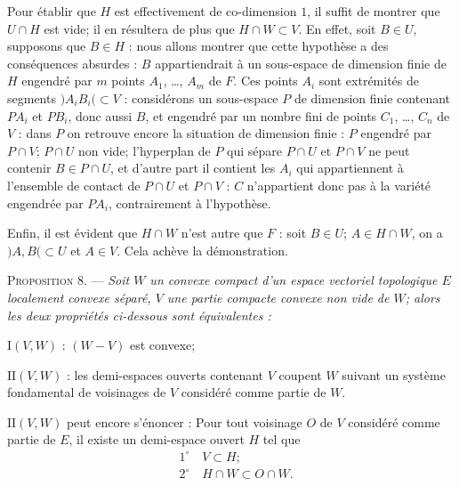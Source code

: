 \documentclass[11pt]{article}
\newenvironment{prop}[1][]{\par\medskip\noindent\textsc{Proposition #1.} --- \itshape}{\par\medskip}
\newenvironment{proof}[1][]{\par}{\par}
\begin{document}
\begin{proof}
Pour établir que $H$ est effectivement de co-dimension $1$, il suffit de montrer que $U\cap H$ est
vide; il en résultera de plus que $H\cap W\subset V$. En effet, soit $B\in U$, supposons que
$B\in H$ : nous allons montrer que cette hypothèse a des conséquences absurdes : $B$
appartiendrait à un sous-espace de dimension finie de $H$ engendré par $m$ points $A_1$, \ldots,
$A_m$ de $F$. Ces points $A_i$ sont extrémités de segments $)A_iB_i(\subset V$ : considérons un
sous-espace $P$ de dimension finie contenant $PA_i$ et $PB_i$, donc aussi $B$, et engendré par un
nombre fini de points $C_1$, \ldots, $C_n$ de $V$ : dans $P$ on retrouve encore la situation de
dimension finie : $P$ engendré par $P\cap V$; $P\cap U$ non vide; l'hyperplan de $P$ qui sépare
$P\cap U$ et $P\cap V$ ne peut contenir $B\in P\cap U$, et d'autre part il contient les $A_i$ qui
appartiennent à l'ensemble de contact de $P\cap U$ et $P\cap V$ : $C$ n'appartient donc pas à la
variété engendrée par $PA_i$, contrairement à l'hypothèse.

Enfin, il est évident que $H\cap W$ n'est autre que $F$ : soit $B\in U$; $A\in H\cap W$, on a
$)A, B(\subset U$ et $A\in V$. Cela achève la démonstration.
\end{proof}

\begin{prop}[8]
Soit $W$ un convexe compact d'un espace vectoriel topologique $E$ localement convexe séparé, $V$
une partie compacte convexe non vide de $W$; alors les deux propriétés ci-dessous sont
équivalentes :

$\mathrm{I}(V, W)$ : $(W-V)$ est convexe;

$\mathrm{II}(V, W)$ : les demi-espaces ouverts contenant $V$ coupent $W$ suivant un système
fondamental de voisinages de $V$ considéré comme partie de $W$.

$\mathrm{II}(V, W)$ peut encore s'énoncer : Pour tout voisinage $O$ de $V$ considéré comme partie
de $E$, il existe un demi-espace ouvert $H$ tel que
\[ \begin{aligned} &1^{\circ}\quad V\subset H;\\ &2^{\circ}\quad H\cap W\subset O\cap W.
\end{aligned} \]
\end{prop}
\end{document}
